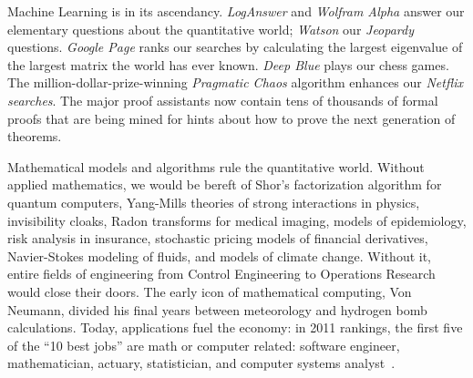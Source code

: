 \documentclass{llncs}
\begin{document}
Machine Learning is in its ascendancy.  {\it LogAnswer} and {\it
  Wolfram Alpha} answer our elementary questions about the
quantitative world; {\it Watson} our {\it Jeopardy} questions. {\it
  Google Page} ranks our searches by calculating the largest eigenvalue of the largest matrix
the world has ever known.  {\it Deep Blue} plays our chess
games. The million-dollar-prize-winning {\it Pragmatic Chaos}
algorithm enhances our {\it Netflix searches}.  The major proof
assistants now contain tens of thousands of formal proofs that are
being mined for hints about how to prove the next generation of
theorems.

Mathematical models and algorithms rule the quantitative world.
Without applied mathematics, we would be bereft of Shor's
factorization algorithm for quantum computers, Yang-Mills theories of
strong interactions in physics, invisibility cloaks, Radon transforms for medical imaging,
models of epidemiology, risk analysis in insurance, stochastic pricing
models of financial derivatives, Navier-Stokes modeling of fluids, and
models of climate change. 
Without it, entire fields of engineering from Control Engineering to
Operations Research would close their doors.  The early icon of
mathematical computing, Von Neumann, divided his final years between
meteorology and hydrogen bomb calculations.
Today, applications fuel the
economy: in 2011 rankings, the first five of the ``10 best jobs'' are
math or computer related: software engineer, mathematician, actuary,
statistician, and computer systems analyst~\cite{CC11}.  



\end{document}
